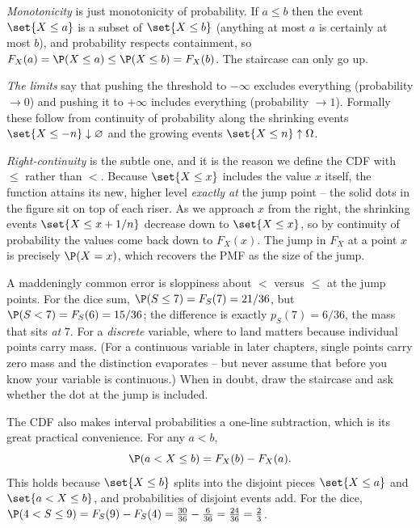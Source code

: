 \begin{whybox}
\emph{Monotonicity} is just monotonicity of probability. If $a \le b$ then the event
$\set{X \le a}$ is a subset of $\set{X \le b}$ (anything at most $a$ is certainly at
most $b$), and probability respects containment, so
$F_X(a) = \P(X \le a) \le \P(X \le b) = F_X(b)$. The staircase can only go up.

\emph{The limits} say that pushing the threshold to $-\infty$ excludes everything
(probability $\to 0$) and pushing it to $+\infty$ includes everything (probability
$\to 1$). Formally these follow from continuity of probability along the shrinking
events $\set{X \le -n}\downarrow \varnothing$ and the growing events
$\set{X \le n}\uparrow \Omega$.

\emph{Right-continuity} is the subtle one, and it is the reason we define the CDF with
$\le$ rather than $<$. Because $\set{X \le x}$ includes the value $x$ itself, the
function attains its new, higher level \emph{exactly at} the jump point -- the solid
dots in the figure sit on top of each riser. As we approach $x$ from the right, the
shrinking events $\set{X \le x + 1/n}$ decrease down to $\set{X \le x}$, so by
continuity of probability the values come back down to $F_X(x)$. The jump in $F_X$ at a
point $x$ is precisely $\P(X = x)$, which recovers the PMF as the size of the jump.
\end{whybox}

\begin{trapbox}
A maddeningly common error is sloppiness about $<$ versus $\le$ at the jump points.
For the dice sum, $\P(S \le 7) = F_S(7) = 21/36$, but $\P(S < 7) = F_S(6) = 15/36$;
the difference is exactly $p_S(7) = 6/36$, the mass that sits \emph{at} $7$. For a
\emph{discrete} variable, where to land matters because individual points carry mass.
(For a continuous variable in later chapters, single points carry zero mass and the
distinction evaporates -- but never assume that before you know your variable is
continuous.) When in doubt, draw the staircase and ask whether the dot at the jump is
included.
\end{trapbox}

The CDF also makes interval probabilities a one-line subtraction, which is its great
practical convenience. For any $a < b$,
\[
  \P(a < X \le b) = F_X(b) - F_X(a).
\]
This holds because $\set{X \le b}$ splits into the disjoint pieces $\set{X \le a}$ and
$\set{a < X \le b}$, and probabilities of disjoint events add. For the dice,
$\P(4 < S \le 9) = F_S(9) - F_S(4) = \tfrac{30}{36} - \tfrac{6}{36} = \tfrac{24}{36}
= \tfrac{2}{3}$.

